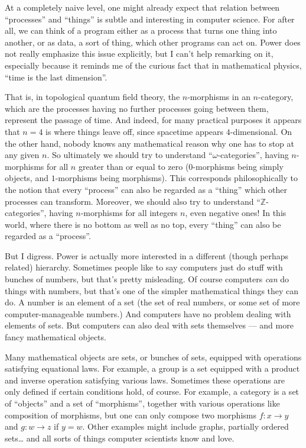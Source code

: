 \documentclass{article}
\begin{document}
At a completely naive level, one might already expect that relation
between ``processes'' and ``things'' is subtle and interesting in
computer science. For after all, we can think of a program either as a
process that turns one thing into another, or as data, a sort of thing,
which other programs can act on. Power does not really emphasize this
issue explicitly, but I can't help remarking on it, especially because
it reminds me of the curious fact that in mathematical physics, ``time
is the last dimension''.

That is, in topological quantum field theory, the \(n\)-morphisms in an
\(n\)-category, which are the processes having no further processes
going between them, represent the passage of time. And indeed, for many
practical purposes it appears that \(n = 4\) is where things leave off,
since spacetime appears \(4\)-dimensional. On the other hand, nobody
knows any mathematical reason why one has to stop at any given \(n\). So
ultimately we should try to understand ``\(\omega\)-categories'', having
\(n\)-morphisms for all \(n\) greater than or equal to zero (0-morphisms
being simply objects, and \(1\)-morphisms being morphisms). This
corresponds philosophically to the notion that every ``process'' can
also be regarded as a ``thing'' which other processes can transform.
Moreover, we should also try to understand
``\(\mathbb{Z}\)-categories'', having \(n\)-morphisms for all integers
\(n\), even negative ones! In this world, where there is no bottom as
well as no top, every ``thing'' can also be regarded as a ``process''.

But I digress. Power is actually more interested in a different (though
perhaps related) hierarchy. Sometimes people like to say computers just
do stuff with bunches of numbers, but that's pretty misleading. Of
course computers \emph{can} do things with numbers, but that's one of
the simpler mathematical things they can do. A number is an element of a
set (the set of real numbers, or some set of more computer-manageable
numbers.) And computers have no problem dealing with elements of sets.
But computers can also deal with sets themselves --- and more fancy
mathematical objects.

Many mathematical objects are sets, or bunches of sets, equipped with
operations satisfying equational laws. For example, a group is a set
equipped with a product and inverse operation satisfying various laws.
Sometimes these operations are only defined if certain conditions hold,
of course. For example, a category is a set of ``objects'' and a set of
``morphisms'', together with various operations like composition of
morphisms, but one can only compose two morphisms \(f\colon x\to y\) and
\(g\colon w\to z\) if \(y = w\). Other examples might include graphs,
partially ordered sets\ldots{} and all sorts of things computer
scientists know and love.
\end{document}
